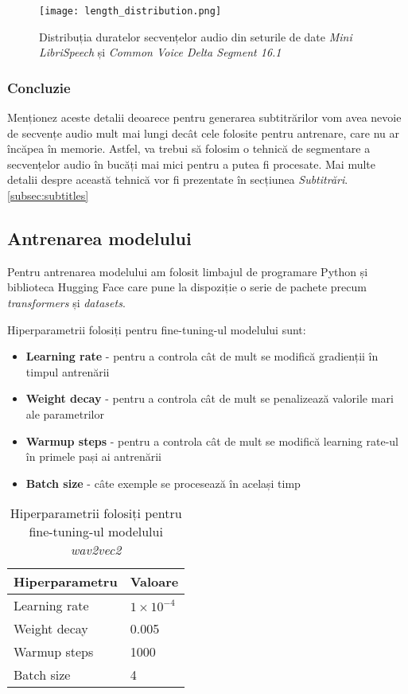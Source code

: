 \begin{figure}[h]
    \centering
    \texttt{[image: length\_distribution.png]}
    \caption{Distribuția duratelor secvențelor audio din seturile de date \textit{Mini LibriSpeech} și \textit{Common Voice Delta Segment 16.1}}
    \label{fig:length-distribution}
\end{figure}

\subsubsection{Concluzie}
Menționez aceste detalii deoarece pentru generarea subtitrărilor vom avea nevoie de secvențe audio
mult mai lungi decât cele folosite pentru antrenare, care nu ar încăpea în memorie. Astfel, va trebui
să folosim o tehnică de segmentare a secvențelor audio în bucăți mai mici pentru a putea fi procesate.
Mai multe detalii despre această tehnică vor fi prezentate în secțiunea \textit{Subtitrări}. \ref{subsec:subtitles}

\subsection{Antrenarea modelului}
Pentru antrenarea modelului am folosit limbajul de programare Python și biblioteca Hugging Face
care pune la dispoziție o serie de pachete precum \textit{transformers} și \textit{datasets}.
\par
Hiperparametrii folosiți pentru fine-tuning-ul modelului sunt:
\begin{itemize}
    \item \textbf{Learning rate} - pentru a controla cât de mult se modifică gradienții în timpul
    antrenării 
    \item \textbf{Weight decay} - pentru a controla cât de mult se penalizează valorile mari ale
    parametrilor 
    \item \textbf{Warmup steps} - pentru a controla cât de mult se modifică learning rate-ul în
    primele pași ai antrenării
    \item \textbf{Batch size} - câte exemple se procesează în același timp
\end{itemize}

\vspace{0.5em}

\begin{table}[h]
    \centering
    \label{tab:wav2vec2-hyperparameters}
    \begin{tabular}{ll}
    \hline
    \textbf{Hiperparametru} & \textbf{Valoare} \\ \hline
    Learning rate & $1 \times 10^{-4}$ \\
    Weight decay & 0.005 \\
    Warmup steps & 1000 \\
    Batch size & 4 \\ \hline
    \end{tabular}
    \caption{Hiperparametrii folosiți pentru fine-tuning-ul modelului \textit{wav2vec2}}
\end{table}

